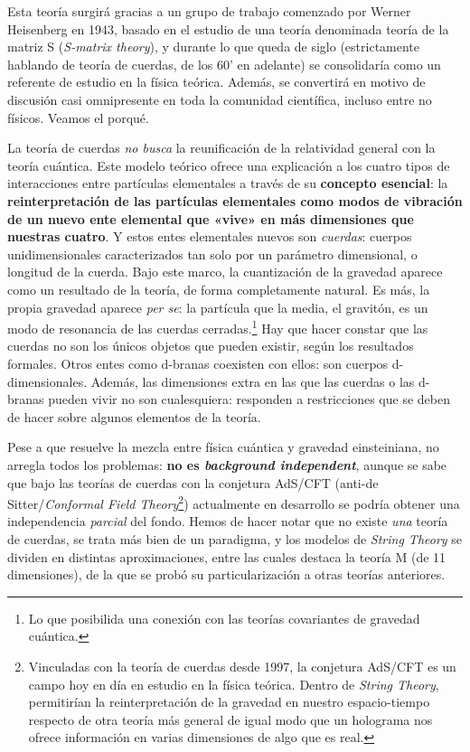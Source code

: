 \documentclass[11pt,a4paper,titlepage]{article}
\begin{document}
Esta teoría surgirá gracias a un grupo de trabajo comenzado por Werner Heisenberg en 1943, basado en el estudio de una teoría denominada teoría de la matriz S (\textit{S-matrix theory}), y durante lo que queda de siglo (estrictamente hablando de teoría de cuerdas, de los 60' en adelante) se consolidaría como un referente de estudio en la física teórica. Además, se convertirá en motivo de discusión casi omnipresente en toda la comunidad científica, incluso entre no físicos. Veamos el porqué.

La teoría de cuerdas \textit{no busca} la reunificación de la relatividad general con la teoría cuántica. Este modelo teórico ofrece una explicación a los cuatro tipos de interacciones entre partículas elementales a través de su \textbf{concepto esencial}: la \textbf{reinterpretación de las partículas elementales como modos de vibración de un nuevo ente elemental que «vive» en más dimensiones que nuestras cuatro}. Y estos entes elementales nuevos son \textit{cuerdas}: cuerpos unidimensionales caracterizados tan solo por un parámetro dimensional, o longitud de la cuerda. Bajo este marco, la cuantización de la gravedad aparece como un resultado de la teoría, de forma completamente natural. Es más, la propia gravedad aparece \textit{per se}: la partícula que la media, el gravitón, es un modo de resonancia de las cuerdas cerradas.\footnote{Lo que posibilida una conexión con las teorías covariantes de gravedad cuántica.} Hay que hacer constar que las cuerdas no son los únicos objetos que pueden existir, según los resultados formales. Otros entes como d-branas coexisten con ellos: son cuerpos d-dimensionales. Además, las dimensiones extra en las que las cuerdas o las d-branas pueden vivir no son cualesquiera: responden a restricciones que se deben de hacer sobre algunos elementos de la teoría.

Pese a que resuelve la mezcla entre física cuántica y gravedad einsteiniana, no arregla todos los problemas: \textbf{no es \textit{background independent}}, aunque se sabe que bajo las teorías de cuerdas con la conjetura AdS/CFT (anti-de Sitter/\textit{Conformal Field Theory}\footnote{Vinculadas con la teoría de cuerdas desde 1997, la conjetura AdS/CFT es un campo hoy en día en estudio en la física teórica. Dentro de \textit{String Theory}, permitirían la reinterpretación de la gravedad en nuestro espacio-tiempo respecto de otra teoría más general de igual modo que un holograma nos ofrece información en varias dimensiones de algo que es real.}) actualmente en desarrollo se podría obtener una independencia \textit{parcial} del fondo. Hemos de hacer notar que no existe \textit{una} teoría de cuerdas, se trata más bien de un paradigma, y los modelos de \textit{String Theory} se dividen en distintas aproximaciones, entre las cuales destaca la teoría M (de 11 dimensiones), de la que se probó su particularización a otras teorías anteriores.
\end{document}
